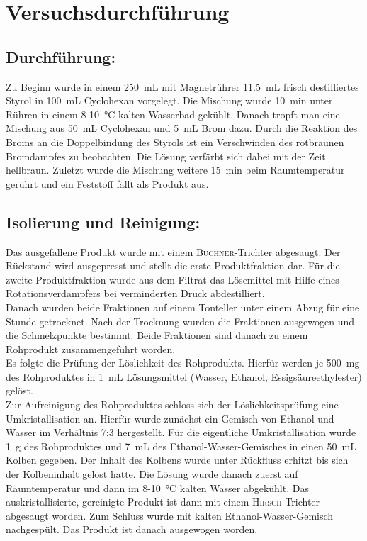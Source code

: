 \newpage
\section{Versuchsdurchführung}
\label{sec:durchfuerung}
\subsection*{Durchführung:}
Zu Beginn wurde in einem \SI{250}{\milli \liter} mit Magnetrührer \SI{11,5}{\milli \liter} frisch destilliertes Styrol in \SI{100}{\milli \liter} Cyclohexan vorgelegt. Die Mischung wurde \SI{10}{\minute} unter Rühren in einem 8-\SI{10}{\celsius} kalten Wasserbad gekühlt. Danach tropft man eine Mischung aus \SI{50}{\milli \liter} Cyclohexan und \SI{5}{\milli \liter} Brom dazu. Durch die Reaktion des Broms an die Doppelbindung des Styrols ist ein Verschwinden des rotbraunen Bromdampfes zu beobachten. Die Lösung verfärbt sich dabei mit der Zeit hellbraun. Zuletzt wurde die Mischung weitere \SI{15}{\minute} beim Raumtemperatur gerührt und ein Feststoff fällt als Produkt aus.

\subsection*{Isolierung und Reinigung:}
Das ausgefallene Produkt wurde mit einem \textsc{Büchner}-Trichter abgesaugt. Der Rückstand wird ausgepresst und stellt die erste Produktfraktion dar. Für die zweite Produktfraktion wurde aus dem Filtrat das Lösemittel mit Hilfe eines Rotationsverdampfers bei verminderten Druck abdestilliert.\\
Danach wurden beide Fraktionen auf einem Tonteller unter einem Abzug für eine Stunde getrocknet. Nach der Trocknung wurden die Fraktionen ausgewogen und die Schmelzpunkte bestimmt. Beide Fraktionen sind danach zu einem Rohprodukt zusammengeführt worden.\\
Es folgte die Prüfung der Löslichkeit des Rohprodukts. Hierfür werden je \SI{500}{\milli \gram} des Rohproduktes in \SI{1}{\milli \liter} Lösungsmittel (Wasser, Ethanol, Essigsäureethylester) gelöst.\\

Zur Aufreinigung des Rohproduktes schloss sich der Löslichkeitsprüfung eine Umkristallisation an. Hierfür wurde zunächst ein Gemisch von Ethanol und Wasser im Verhältnis 7:3 hergestellt. Für die eigentliche Umkristallisation wurde \SI{1}{\gram} des Rohproduktes und \SI{7}{\milli \liter} des Ethanol-Wasser-Gemisches in einen \SI{50}{\milli \liter} Kolben gegeben. Der Inhalt des Kolbens wurde unter Rückfluss erhitzt bis sich der Kolbeninhalt gelöst hatte. Die Lösung wurde danach zuerst auf Raumtemperatur und dann im 8-\SI{10}{\celsius} kalten Wasser abgekühlt. Das auskristallisierte, gereinigte Produkt ist dann mit einem \textsc{Hirsch}-Trichter abgesaugt worden. Zum Schluss wurde mit kalten Ethanol-Wasser-Gemisch nachgespült. Das Produkt ist danach ausgewogen worden.

